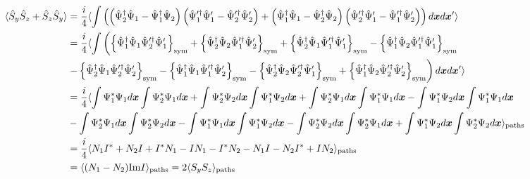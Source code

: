 \begin{equation*}
\begin{split}
	\langle \hat{S}_y \hat{S}_z + \hat{S}_z \hat{S}_y \rangle
	& = \frac{i}{4} \langle \int \left(
		\left(
			\hat{\Psi}^\dagger_2 \hat{\Psi}_1 - \hat{\Psi}^\dagger_1 \hat{\Psi}_2
		\right)
		\left(
			\hat{\Psi}^{\prime\dagger}_1 \hat{\Psi}^\prime_1 - \hat{\Psi}^{\prime\dagger}_2 \hat{\Psi}^\prime_2
		\right)
		+ \left(
			\hat{\Psi}^\dagger_1 \hat{\Psi}_1 - \hat{\Psi}^\dagger_2 \hat{\Psi}_2
		\right)
		\left(
			\hat{\Psi}^{\prime\dagger}_2 \hat{\Psi}^\prime_1 - \hat{\Psi}^{\prime\dagger}_1 \hat{\Psi}^\prime_2
		\right)
	\right) d\boldsymbol{x} d\boldsymbol{x}^\prime \rangle \\
	& = \frac{i}{4} \langle \int \left(
		\left\{  \hat{\Psi}^\dagger_1 \hat{\Psi}_1 \hat{\Psi}^{\prime\dagger}_2 \hat{\Psi}^\prime_1  \right\}_{\mathrm{sym}}
		+ \left\{  \hat{\Psi}^\dagger_2 \hat{\Psi}_2 \hat{\Psi}^{\prime\dagger}_1 \hat{\Psi}^\prime_2  \right\}_{\mathrm{sym}}
		+ \left\{  \hat{\Psi}^\dagger_2 \hat{\Psi}_1 \hat{\Psi}^{\prime\dagger}_1 \hat{\Psi}^\prime_1  \right\}_{\mathrm{sym}}
		- \left\{  \hat{\Psi}^\dagger_1 \hat{\Psi}_2 \hat{\Psi}^{\prime\dagger}_1 \hat{\Psi}^\prime_1  \right\}_{\mathrm{sym}}
	\right. \\
	& \left.
		- \left\{  \hat{\Psi}^\dagger_2 \hat{\Psi}_1 \hat{\Psi}^{\prime\dagger}_2 \hat{\Psi}^\prime_2  \right\}_{\mathrm{sym}}
		- \left\{  \hat{\Psi}^\dagger_1 \hat{\Psi}_1 \hat{\Psi}^{\prime\dagger}_1 \hat{\Psi}^\prime_2  \right\}_{\mathrm{sym}}
		- \left\{  \hat{\Psi}^\dagger_2 \hat{\Psi}_2 \hat{\Psi}^{\prime\dagger}_2 \hat{\Psi}^\prime_1  \right\}_{\mathrm{sym}}
		+ \left\{  \hat{\Psi}^\dagger_1 \hat{\Psi}_2 \hat{\Psi}^{\prime\dagger}_2 \hat{\Psi}^\prime_2  \right\}_{\mathrm{sym}}
	\right) d\boldsymbol{x} d\boldsymbol{x}^\prime \rangle \\
	& = \frac{i}{4} \langle 
		\int \Psi^*_1 \Psi_1 d\boldsymbol{x} \int \Psi^*_2 \Psi_1 d\boldsymbol{x}
		+ \int \Psi^*_2 \Psi_2 d\boldsymbol{x} \int \Psi^*_1 \Psi_2 d\boldsymbol{x}
		+ \int \Psi^*_2 \Psi_1 d\boldsymbol{x} \int \Psi^*_1 \Psi_1 d\boldsymbol{x}
		- \int \Psi^*_1 \Psi_2 d\boldsymbol{x} \int \Psi^*_1 \Psi_1 d\boldsymbol{x} \\
	&	- \int \Psi^*_2 \Psi_1 d\boldsymbol{x} \int \Psi^*_2 \Psi_2 d\boldsymbol{x}
		- \int \Psi^*_1 \Psi_1 d\boldsymbol{x} \int \Psi^*_1 \Psi_2 d\boldsymbol{x}
		- \int \Psi^*_2 \Psi_2 d\boldsymbol{x} \int \Psi^*_2 \Psi_1 d\boldsymbol{x}
		+ \int \Psi^*_1 \Psi_2 d\boldsymbol{x} \int \Psi^*_2 \Psi_2 d\boldsymbol{x}
	 \rangle_{\mathrm{paths}} \\
	& = \frac{i}{4} \langle 
		N_1 I^*
		+ N_2 I
		+ I^* N_1
		- I N_1
		- I^* N_2
		- N_1 I
		- N_2 I^*
		+ I N_2
	 \rangle_{\mathrm{paths}} \\
	& = \langle  (N_1 - N_2) \mathrm{Im} I  \rangle_{\mathrm{paths}} = 2 \langle  S_y S_z  \rangle_{\mathrm{paths}}
\end{split}
\end{equation*}

